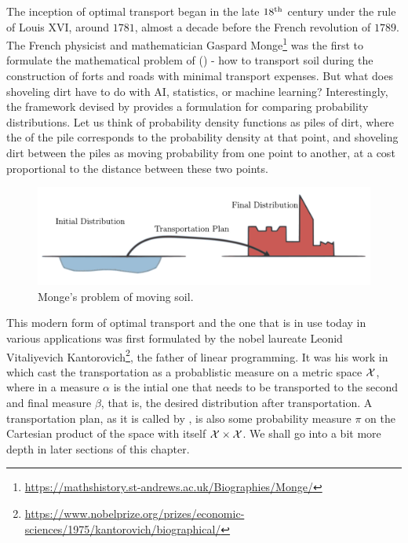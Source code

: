 The inception of optimal transport began in the late $18\textsuperscript{th}$ century under the rule of Louis \RN{16}, around $1781$, almost a decade before the French revolution of $1789$. The French physicist and mathematician Gaspard Monge\footnote{\url{https://mathshistory.st-andrews.ac.uk/Biographies/Monge/}} was the first to formulate the mathematical problem of  () - how to transport soil during the construction of forts and roads with minimal transport expenses. But what does shoveling dirt have to do with AI, statistics, or machine learning? Interestingly, the framework devised by \citeauthor{monge1781memoire} provides a formulation for comparing probability distributions.
Let us think of probability density functions as piles of dirt, where the  of the pile corresponds to the probability density at that point, and shoveling dirt between the piles as moving probability from one point to another, at a cost proportional to the distance between these two points.

\begin{figure}[ht]
    \centering
    \includegraphics[width=\linewidth]{chapters/assets/ot/monge.pdf}
    \caption{Monge's problem of moving soil.}
    \label{fig:monges-problem}
\end{figure}

This modern form of optimal transport and the one that is in use today in various applications was first formulated by the nobel laureate Leonid Vitaliyevich Kantorovich\footnote{\url{https://www.nobelprize.org/prizes/economic-sciences/1975/kantorovich/biographical/}}, the father of linear programming. 
It was his work in \citeyear{Kantorovich42} which cast the transportation as a probablistic measure on a metric space $\mathcal{X}$, where in a measure $\alpha$ is the intial one that needs to be transported to the second and final measure $\beta$, that is, the desired distribution after transportation. A transportation plan, as it is called by \citeauthor{Kantorovich42}, is also some probability measure $\pi$ on the Cartesian product of the space with itself $\mathcal{X} \times \mathcal{X}$.
We shall go into a bit more depth in later sections of this chapter.

